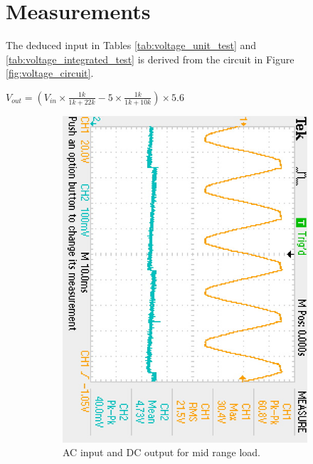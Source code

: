\section{Measurements} \label{sec:measurements_voltage}
The deduced input in Tables \ref{tab:voltage_unit_test} and \ref{tab:voltage_integrated_test} is derived from the circuit in Figure \ref{fig:voltage_circuit}.

$V_{out} = (V_{in} \times \frac{1k}{1k + 22k} - 5 \times \frac{1k}{1k+10k}) \times 5.6$
\begin{figure}
 \centering
     \begin{subfigure}[]{0.45\textwidth}
        \centering
         \includegraphics[height=1\linewidth,angle=90]{./Figures/voltage_measure}
		    \caption{AC input and DC output for mid range load.} \label{subfig:voltage_measure}
     \end{subfigure}
      \begin{subfigure}[]{0.45\textwidth}
              \centering

\end{subfigure}
\end{figure}
